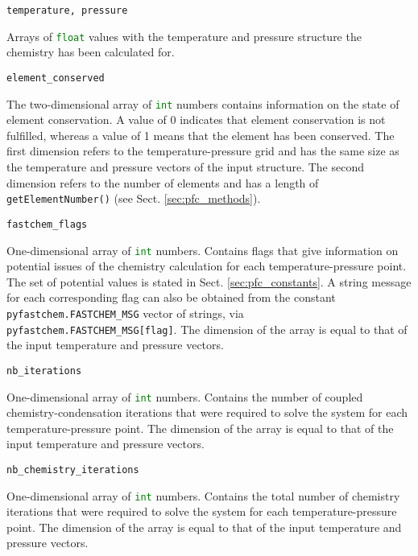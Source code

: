 \documentclass[numbers=noenddot]{aux/fcmanual}
\begin{document}
\bigbreak

\lstinline[language=Python]!temperature, pressure!
\begin{addmargin}[25pt]{0pt}
	Arrays of \lstinline[language=Python]!float! values with the temperature and pressure structure the chemistry has been calculated for.
\end{addmargin}

\bigbreak

\lstinline!element_conserved!
\begin{addmargin}[25pt]{0pt}
	The two-dimensional array of \lstinline[language=Python]!int! numbers contains information on the state of element conservation. A value of 0 indicates that element conservation is not fulfilled, whereas a value of 1 means that the element has been conserved. The first dimension refers to the temperature-pressure grid and has the same size as the temperature and pressure vectors of the input structure. The second dimension refers to the number of elements and has a length of \lstinline!getElementNumber()! (see Sect. \ref{sec:pfc_methods}).
\end{addmargin}

\bigbreak

\lstinline!fastchem_flags!
\begin{addmargin}[25pt]{0pt}
	One-dimensional array of \lstinline[language=Python]!int! numbers. Contains flags that give information on potential issues of the chemistry calculation for each temperature-pressure point. The set of potential values is stated in Sect. \ref{sec:pfc_constants}. A string message for each corresponding flag can also be obtained from the constant \lstinline!pyfastchem.FASTCHEM_MSG! vector of strings, via \lstinline!pyfastchem.FASTCHEM_MSG[flag]!. The dimension of the array is equal to that of the input temperature and pressure vectors.
\end{addmargin}

\bigbreak

\lstinline!nb_iterations!
\begin{addmargin}[25pt]{0pt}
	One-dimensional array of \lstinline[language=Python]!int! numbers. Contains the number of coupled chemistry-condensation iterations that were required to solve the system for each temperature-pressure point. The dimension of the array is equal to that of the input temperature and pressure vectors.
\end{addmargin}

\bigbreak

\lstinline!nb_chemistry_iterations!
\begin{addmargin}[25pt]{0pt}
	One-dimensional array of \lstinline[language=Python]!int! numbers. Contains the total number of chemistry iterations that were required to solve the system for each temperature-pressure point. The dimension of the array is equal to that of the input temperature and pressure vectors.
\end{addmargin}
\end{document}
